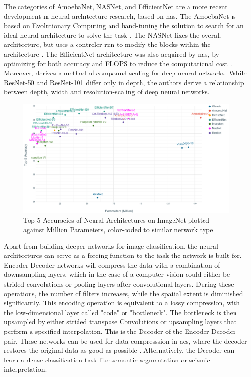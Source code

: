 The categories of AmoebaNet, NASNet, and EfficientNet are a more recent development in neural architecture research, based on \acf{nas}. The AmoebaNet is based on Evolutionary Computing and hand-tuning the solution to search for an ideal neural architecture to solve the task \citep{real2019regularized}. The NASNet fixes the overall architecture, but uses a controler \ac{rnn} to modify the blocks within the architecture \citep{zoph2018learning}. The EfficientNet architecture was also acquired by \ac{nas}, by optimizing for both accuracy and FLOPS to reduce the computational cost \citep{tan2019efficientnet}. Moreover, \citet{tan2019efficientnet} derives a method of compound scaling for deep neural networks. While ResNet-50 and ResNet-101 differ only in depth, the authors derive a relationship between depth, width and resolution-scaling of deep neural networks.

\begin{figure}[H]
    \centering
    \includegraphics[width=1.1\textwidth]{figures/imagenetsota.png}
    \caption{Top-5 Accuracies of Neural Architectures on ImageNet plotted against Million Parameters, color-coded to similar network type}
    \label{fig:cnnsota}
\end{figure}

Apart from building deeper networks for image classification, the neural architectures can serve as a  forcing function to the task the network is built for. Encoder-Decoder networks will compress the data with a combination of downsampling layers, which in the case of a computer vision could either be strided convolutions or pooling layers after convolutional layers. During these operations, the number of filters increases, while the spatial extent is diminished significantly. This encoding operation is equivalent to a lossy compression, with the low-dimensional layer called "code" or "bottleneck". The bottleneck is then upsampled by either strided transpose Convolutions or upsampling layers that perform a specified interpolation. This is the Decoder of the Encoder-Decoder pair. These networks can be used for data compresssion in \acp{ae}, where the decoder restores the original data as good as possible \citep{hinton2006reducing}. Alternatively, the Decoder can learn a dense classification task like semantic segmentation or seismic interpretation.

